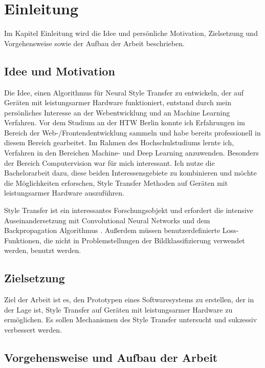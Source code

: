 \chapter{Einleitung}

Im Kapitel Einleitung wird die Idee und persönliche Motivation, Zielsetzung und Vorgehensweise sowie der Aufbau der Arbeit beschrieben.

\section{Idee und Motivation}

Die Idee, einen Algorithmus für Neural Style Transfer zu entwickeln, der auf Geräten mit leistungsarmer Hardware funktioniert, entstand durch mein persönliches Interesse an der Webentwicklung und an Machine Learning Verfahren. Vor dem Studium an der HTW Berlin konnte ich Erfahrungen im Bereich der Web-/Frontendentwicklung sammeln und habe bereits professionell in diesem Bereich gearbeitet. Im Rahmen des Hochschulstudiums lernte ich, Verfahren in den Bereichen Machine- und Deep Learning anzuwenden. Besonders der Bereich Computervision war für mich interessant. Ich nutze die Bachelorarbeit dazu, diese beiden Interessensgebiete zu kombinieren und möchte die Möglichkeiten erforschen, Style Transfer Methoden auf Geräten mit leistungsarmer Hardware auszuführen.

Style Transfer ist ein interessantes Forschungsobjekt und erfordert die intensive Auseinandersetzung mit Convolutional Neural Networks \cite{lecun-gradientbased-learning-applied-1998} und dem Backpropagation Algorithmus \cite{doi:10.1162/neco.1989.1.4.541}. Außerdem müssen benutzerdefinierte Loss-Funktionen, die nicht in Problemstellungen der Bildklassifizierung verwendet werden, benutzt werden.

\section{Zielsetzung}

Ziel der Arbeit ist es, den Prototypen eines Softwaresystems zu erstellen, der in der Lage ist, Style Transfer auf Geräten mit leistungsarmer Hardware zu ermöglichen. Es sollen Mechanismen des Style Transfer untersucht und sukzessiv verbessert werden.

\section{Vorgehensweise und Aufbau der Arbeit}

